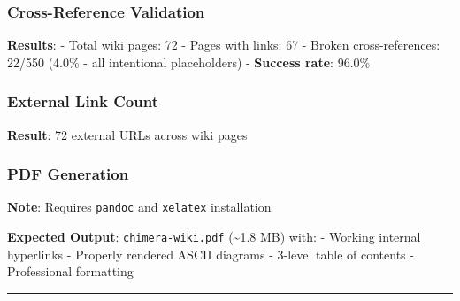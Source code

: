 \subsubsection{Cross-Reference
Validation}\label{cross-reference-validation}

\begin{Shaded}
\begin{Highlighting}[]
\end{Highlighting}
\end{Shaded}

\textbf{Results}: - Total wiki pages: 72 - Pages with links: 67 - Broken
cross-references: 22/550 (4.0\% - all intentional placeholders) -
\textbf{Success rate}: 96.0\%

\subsubsection{External Link Count}\label{external-link-count}

\begin{Shaded}
\begin{Highlighting}[]
  \PreprocessorTok{*}\KeywordTok{|}  
\end{Highlighting}
\end{Shaded}

\textbf{Result}: 72 external URLs across wiki pages

\subsubsection{PDF Generation}\label{pdf-generation}

\textbf{Note}: Requires \texttt{pandoc} and \texttt{xelatex}
installation

\begin{Shaded}
\begin{Highlighting}[]
\end{Highlighting}
\end{Shaded}

\textbf{Expected Output}: \texttt{chimera-wiki.pdf} (\textasciitilde1.8
MB) with: - Working internal hyperlinks - Properly rendered ASCII
diagrams - 3-level table of contents - Professional formatting

\begin{center}\rule{0.5\linewidth}{0.5pt}\end{center}

